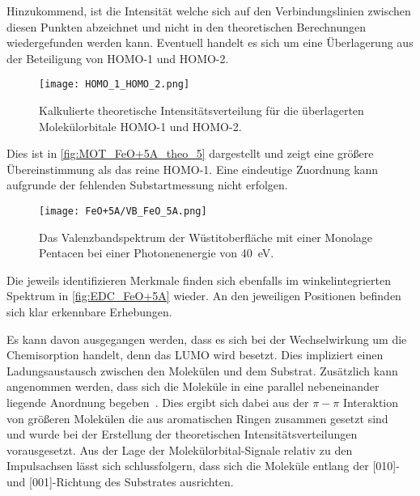             Hinzukommend, ist die Intensität welche sich auf den Verbindungslinien zwischen diesen Punkten abzeichnet und nicht in den theoretischen Berechnungen wiedergefunden werden kann.
            Eventuell handelt es sich um eine Überlagerung aus der Beteiligung von HOMO-1 und HOMO-2.
            \begin{figure}
                \centering
                \texttt{[image: HOMO\_1\_HOMO\_2.png]}
                \caption{Kalkulierte theoretische Intensitätsverteilung für die überlagerten Molekülorbitale HOMO-1 und HOMO-2.} %
                \label{fig:MOT_FeO+5A_theo_5}
            \end{figure}
            Dies ist in \autoref{fig:MOT_FeO+5A_theo_5} dargestellt und zeigt eine größere Übereinstimmung als das reine HOMO-1.
            Eine eindeutige Zuordnung kann aufgrunde der fehlenden Substartmessung nicht erfolgen.

            \begin{figure}
                \centering
                \texttt{[image: FeO+5A/VB\_FeO\_5A.png]}
                \caption{Das Valenzbandspektrum der Wüstitoberfläche mit einer Monolage Pentacen bei einer Photonenenergie von \SI{40}{\electronvolt}.}
                \label{fig:EDC_FeO+5A}
            \end{figure}
            Die jeweils identifizieren Merkmale finden sich ebenfalls im winkelintegrierten Spektrum in \autoref{fig:EDC_FeO+5A} wieder.
            An den jeweiligen Positionen befinden sich klar erkennbare Erhebungen.

            Es kann davon ausgegangen werden, dass es sich bei der Wechselwirkung um die Chemisorption handelt, denn das LUMO wird besetzt.
            Dies impliziert einen Ladungsaustausch zwischen den Molekülen und dem Substrat.
            Zusätzlich kann angenommen werden, dass sich die Moleküle in eine parallel nebeneinander liegende Anordnung begeben~\cite{IF_13}.
            Dies ergibt sich dabei aus der $\pi-\pi$ Interaktion von größeren Molekülen die aus aromatischen Ringen zusammen gesetzt sind~\cite{IF_13} und wurde bei der Erstellung der theoretischen Intensitätsverteilungen vorausgesetzt.
            Aus der Lage der Molekülorbital-Signale relativ zu den Impulsachsen lässt sich schlussfolgern, dass sich die Moleküle entlang der [010]- und [001]-Richtung des Substrates ausrichten.

